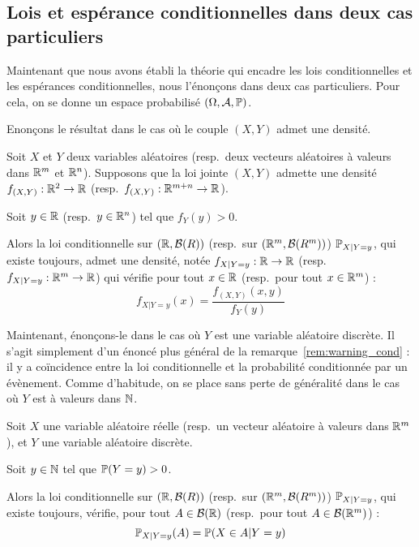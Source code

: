 \documentclass[../integ-proba.tex]{subfiles}
\begin{document}
    \subsection{Lois et espérance conditionnelles dans deux cas particuliers}

    Maintenant que nous avons établi la théorie qui encadre les lois conditionnelles et les espérances conditionnelles, nous l'énonçons dans deux cas particuliers.
    Pour cela, on se donne un espace probabilisé $\left( \Omega, \mathcal{A}, \mathbb{P} \right)$.

    Enonçons le résultat dans le cas où le couple $\left( X, Y \right)$ admet une densité.

    \begin{thm}
        Soit $X$ et $Y$ deux variables aléatoires (resp.\ deux vecteurs aléatoires à valeurs dans $\mathbb{R}^m$ et $\mathbb{R}^n$).
        Supposons que la loi jointe $\left( X, Y \right)$ admette une densité $f_{\left( X, Y \right)}: \mathbb{R}^2 \rightarrow \mathbb{R}$ (resp.\ $f_{\left( X, Y \right)}: \mathbb{R}^{m+n} \rightarrow \mathbb{R}$).

        Soit $y \in \mathbb{R}$ (resp.\ $y \in \mathbb{R}^n$) tel que $f_Y(y) > 0$.

        Alors la loi conditionnelle sur $\left( \mathbb{R}, \mathcal{B}(R) \right)$ (resp.\ sur $\left( \mathbb{R}^m, \mathcal{B}(R^m) \right)$) $\mathbb{P}_{X | Y = y}$, qui existe toujours, admet une densité, notée $f_{X | Y=y} : \mathbb{R} \rightarrow \mathbb{R}$ (resp.\ $f_{X | Y=y} : \mathbb{R}^m \rightarrow \mathbb{R}$) qui vérifie pour tout $x \in \mathbb{R}$ (resp.\ pour tout $x \in \mathbb{R}^m$) :
        \begin{displaymath}
            f_{X | Y = y}(x) = \dfrac{f_{\left( X, Y \right)}(x,y)}{f_Y(y)}
        \end{displaymath}
    \end{thm}

    Maintenant, énonçons-le dans le cas où $Y$ est une variable aléatoire discrète.
    Il s'agit simplement d'un énoncé plus général de la remarque~\ref{rem:warning_cond} : il y a coïncidence entre la loi conditionnelle et la probabilité conditionnée par un évènement.
    Comme d'habitude, on se place sans perte de généralité dans le cas où $Y$ est à valeurs dans $\mathbb{N}$.

    \begin{thm}
        Soit $X$ une variable aléatoire réelle (resp.\ un vecteur aléatoire à valeurs dans $\mathbb{R}^m$), et $Y$ une variable aléatoire discrète.

        Soit $y \in \mathbb{N}$ tel que $\mathbb{P}(Y = y) > 0$.

        Alors la loi conditionnelle sur $\left( \mathbb{R}, \mathcal{B}(R) \right)$ (resp.\ sur $\left( \mathbb{R}^m, \mathcal{B}(R^m) \right)$) $\mathbb{P}_{X | Y = y}$, qui existe toujours, vérifie, pour tout $A \in \mathcal{B}(\mathbb{R})$ (resp.\ pour tout $A \in \mathcal{B}(\mathbb{R}^m)$) :
        \begin{displaymath}
            \mathbb{P}_{X | Y = y}(A) = \mathbb{P}(X \in A | Y = y)
        \end{displaymath}
    \end{thm}
\end{document}
